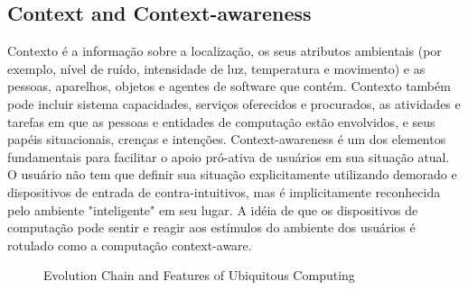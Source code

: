 \documentclass[12pt]{article} %
\begin{document}
\subsection{Context and Context-awareness} %


Contexto é a informação sobre a localização, os seus atributos ambientais (por exemplo, nível de ruído, intensidade de luz, temperatura e movimento) e as pessoas, aparelhos, objetos e agentes de software que contém. Contexto também pode incluir sistema capacidades, serviços oferecidos e procurados, as atividades e tarefas em que as pessoas e entidades de computação estão envolvidos, e seus papéis situacionais, crenças e intenções. Context-awareness é um dos elementos fundamentais para facilitar o apoio pró-ativa de usuários em sua situação atual. O usuário não tem que definir sua situação explicitamente utilizando demorado e dispositivos de entrada de contra-intuitivos, mas é implicitamente reconhecida pelo ambiente "inteligente" em seu lugar. A idéia de que os dispositivos de computação pode sentir e reagir aos estímulos do ambiente dos usuários é rotulado como a computação context-aware.

\begin{figure}[H]
\caption{Evolution Chain and Features of Ubiquitous Computing}
\label{fig:speciation}
\end{figure}
\end{document}
